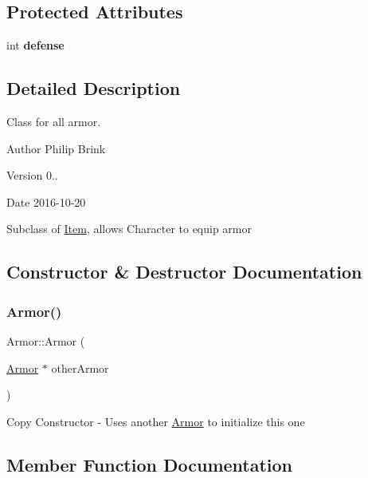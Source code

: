 \subsection*{Protected Attributes}
\begin{DoxyCompactItemize}
\item 
\hypertarget{class_armor_a15c6514c68303d572a71bf516cd1690b}{}\label{class_armor_a15c6514c68303d572a71bf516cd1690b} 
int {\bfseries defense}
\end{DoxyCompactItemize}


\subsection{Detailed Description}
Class for all armor. 

\begin{DoxyAuthor}{Author}
Philip Brink 
\end{DoxyAuthor}
\begin{DoxyVersion}{Version}
0.. 
\end{DoxyVersion}
\begin{DoxyDate}{Date}
2016-\/10-\/20
\end{DoxyDate}
Subclass of \hyperlink{class_item}{Item}, allows Character to equip armor 

\subsection{Constructor \& Destructor Documentation}
\hypertarget{class_armor_abee983c0e4e8fd5a5d3fccebc6d079dc}{}\label{class_armor_abee983c0e4e8fd5a5d3fccebc6d079dc} 
\subsubsection{\texorpdfstring{Armor()}{Armor()}}
{\footnotesize\ttfamily Armor\+::\+Armor (\begin{DoxyParamCaption}\item[{\hyperlink{class_armor}{Armor} $\ast$}]{other\+Armor }\end{DoxyParamCaption})}

Copy Constructor -\/ Uses another \hyperlink{class_armor}{Armor} to initialize this one 

\subsection{Member Function Documentation}
\hypertarget{class_armor_a167690954e4ccd6c4fd9adfed24bc132}{}\label{class_armor_a167690954e4ccd6c4fd9adfed24bc132} 
